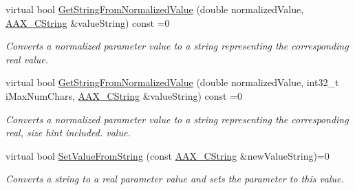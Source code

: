 \begin{Indent}
\begin{DoxyCompactItemize}
virtual bool \mbox{\hyperlink{a01857_a09ace7e2456911607d113593ab4d55d6}{Get\+String\+From\+Normalized\+Value}} (double normalized\+Value, \mbox{\hyperlink{a01573}{A\+A\+X\+\_\+\+C\+String}} \&value\+String) const =0
\begin{DoxyCompactList}\small\item\em Converts a normalized parameter value to a string representing the corresponding real value. \end{DoxyCompactList}\item 
virtual bool \mbox{\hyperlink{a01857_a9339e5ef2545f22fe95f6c6ab40ee3aa}{Get\+String\+From\+Normalized\+Value}} (double normalized\+Value, int32\+\_\+t i\+Max\+Num\+Chars, \mbox{\hyperlink{a01573}{A\+A\+X\+\_\+\+C\+String}} \&value\+String) const =0
\begin{DoxyCompactList}\small\item\em Converts a normalized parameter value to a string representing the corresponding real, size hint included. value. \end{DoxyCompactList}\item 
virtual bool \mbox{\hyperlink{a01857_ae4caa85ca368e684f813147443bdde55}{Set\+Value\+From\+String}} (const \mbox{\hyperlink{a01573}{A\+A\+X\+\_\+\+C\+String}} \&new\+Value\+String)=0
\begin{DoxyCompactList}\small\item\em Converts a string to a real parameter value and sets the parameter to this value. \end{DoxyCompactList}\end{DoxyCompactItemize}
\end{Indent}
